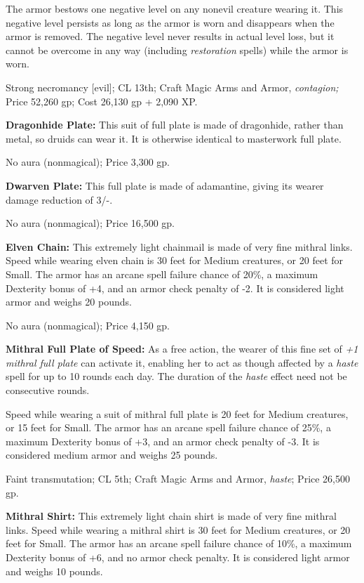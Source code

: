 \documentclass{article}
\begin{document}
The armor bestows one negative level on any nonevil creature wearing it. This negative 
level persists as long as the armor is worn and disappears when the armor is removed. 
The negative level never results in actual level loss, but it cannot be overcome 
in any way (including \textit{restoration }spells) while the armor is worn.

Strong necromancy [evil]; CL 13th; Craft Magic Arms and Armor, \textit{contagion; 
}Price 52,260 gp; Cost 26,130 gp + 2,090 XP.

\textbf{Dragonhide Plate:} This suit of full plate is made of dragonhide, rather 
than metal, so druids can wear it. It is otherwise identical to masterwork full 
plate.

No aura (nonmagical); Price 3,300 gp.

\textbf{Dwarven Plate:} This full plate is made of adamantine, giving its wearer 
damage reduction of 3/-.

No aura (nonmagical); Price 16,500 gp.

\textbf{Elven Chain:} This extremely light chainmail is made of very fine mithral 
links. Speed while wearing elven chain is 30 feet for Medium creatures, or 20 feet 
for Small. The armor has an arcane spell failure chance of 20\%, a maximum Dexterity 
bonus of +4, and an armor check penalty of -2. It is considered light armor and 
weighs 20 pounds.

No aura (nonmagical); Price 4,150 gp.

\textbf{Mithral Full Plate of Speed:} As a free action, the wearer of this fine 
set of \textit{+1 mithral full plate }can activate it, enabling her to act as though 
affected by a \textit{haste }spell for up to 10 rounds each day. The duration of 
the \textit{haste }effect need not be consecutive rounds.

Speed while wearing a suit of mithral full plate is 20 feet for Medium creatures, 
or 15 feet for Small. The armor has an arcane spell failure chance of 25\%, a maximum 
Dexterity bonus of +3, and an armor check penalty of -3. It is considered medium 
armor and weighs 25 pounds.

Faint transmutation; CL 5th; Craft Magic Arms and Armor, \textit{haste}; Price 
26,500 gp.

\textbf{Mithral Shirt:} This extremely light chain shirt is made of very fine mithral 
links. Speed while wearing a mithral shirt is 30 feet for Medium creatures, or 
20 feet for Small. The armor has an arcane spell failure chance of 10\%, a maximum 
Dexterity bonus of +6, and no armor check penalty. It is considered light armor 
and weighs 10 pounds.
\end{document}
